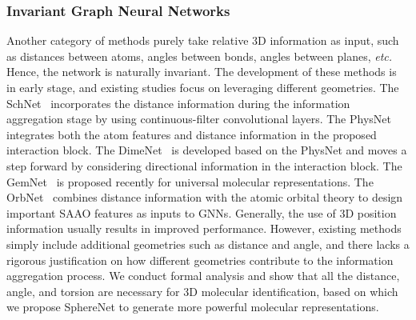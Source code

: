 \documentclass{article}
\begin{document}
\subsubsection{Invariant Graph Neural Networks} \label{sec:rw_relative}
Another category of methods purely take relative 3D information as input,
such as
distances between atoms, angles between bonds, angles between planes, \emph{etc.}
\textcolor{COLOR}{Hence, the network is naturally invariant.}
The development of these methods is in early stage, and
existing studies focus on leveraging different geometries.
The SchNet~\citep{schutt2017schnet} 
incorporates the distance information during the information aggregation stage by using continuous-filter convolutional layers.
The PhysNet~\citep{unke2019physnet} integrates both
the atom features and distance information in the proposed interaction block.
The DimeNet~\citep{klicpera_dimenet_2020}
is developed based on the PhysNet and moves a step forward by
considering directional information in the interaction block.
The GemNet~\citep{klicpera2021gemnet} is proposed recently for universal 
molecular representations.
The OrbNet~\citep{qiao2020orbnet}
combines distance information with the 
atomic orbital theory to design important SAAO features as inputs to
GNNs.
Generally, the use of 3D position information usually results in
improved performance. However,
existing methods simply include additional geometries such as distance and angle, and there lacks a rigorous justification on how different geometries contribute to the information aggregation process.
We conduct formal analysis and show that all the distance, angle, and torsion are necessary for 3D molecular identification, based on which we propose SphereNet to generate more powerful molecular representations.
\end{document}
